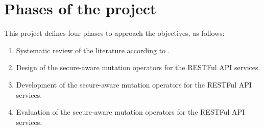 \section{Phases of the project} \label{sec:phases}
This project defines four phases to approach the objectives, as follows:
  \begin{enumerate}
    \item Systematic review of the literature according to \cite{Kitchenham2002}.
    \item Design of the secure-aware mutation operators for the RESTFul API services.
    \item Development of the secure-aware mutation operators for the RESTFul API services.
    \item Evaluation of the secure-aware mutation operators for the RESTFul API services.
\end{enumerate}


